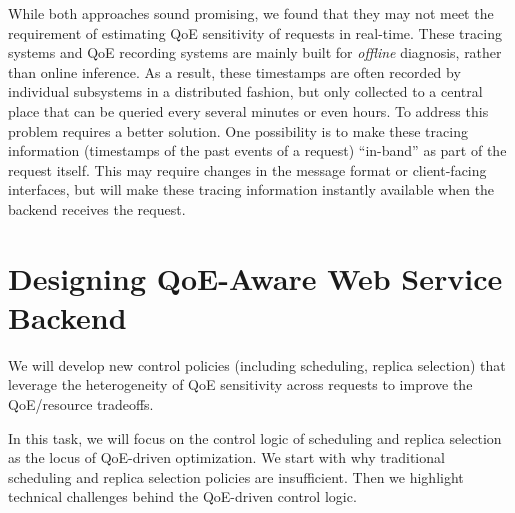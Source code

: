 While both approaches sound promising, we found that they may not meet the requirement of estimating QoE sensitivity of requests in real-time. 
These tracing systems and QoE recording systems are mainly built for {\em offline} diagnosis, rather than online inference. As a result, these timestamps are often recorded by individual subsystems in a distributed fashion, but only collected to a central place that can be queried every several minutes or even hours. 
To address this problem requires a better solution. 
One possibility is to make these tracing information (\eg timestamps of the past events of a request) ``in-band'' as part of the request itself. This may require changes in the message format or client-facing interfaces, but will make these tracing information instantly available when the backend receives the request.


\section{Designing QoE-Aware Web Service Backend}
\label{sec:design}

\begin{task}
We will develop new control policies (including scheduling, replica selection) that leverage the heterogeneity of QoE sensitivity across requests to improve the QoE/resource tradeoffs.
\end{task}

In this task, we will focus on the control logic of scheduling and replica selection as the locus of QoE-driven optimization. 
We start with why traditional scheduling and replica selection policies are insufficient.
Then we highlight technical challenges behind the QoE-driven control logic.



